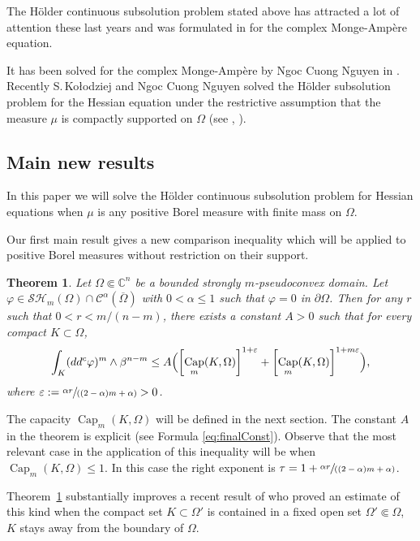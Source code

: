 \documentclass[JEP,XML,SOM,Unicode]{cedram}
\let\epsilon\varepsilon
\newcommand{\spfrac}[2]{\sfrac{#1}{(#2)}}
\newtheorem{theo}{Theorem}
\theoremstyle{definition}
\renewcommand{\C}{\mathbb{C}}
\newcommand{\Cc}{\mathcal{C}}
\DeclareMathOperator{\Capa}{Cap}
\begin{document}
The Hölder continuous subsolution problem stated above has attracted a lot of attention these last years and was formulated in \cite{DGZ16} for the complex Monge-Ampère equation.

\smallskip
It has been solved for the complex Monge-Ampère by Ngoc Cuong Nguyen in \cite{N18a,N18b}.
Recently S.\,Ko{\l}odziej and Ngoc Cuong Nguyen solved the Hölder subsolution problem for the Hessian equation under the restrictive assumption that the measure $\mu$ is compactly supported on $\Omega$ (see \cite{KN18}, \cite{KN19}).

\subsection{Main new results}

In this paper we will solve the Hölder continuous subsolution problem for Hessian equations when $\mu$ is any positive Borel measure with finite mass on $\Omega$.

Our first main result gives a new comparison inequality which will be applied to positive Borel measures without restriction on their support.

\begin{theo}\label{th:A}
Let $\Omega \Subset \C^n$ be a bounded strongly $m$-pseudoconvex domain.
Let $\varphi\in \mathcal{SH}_m(\Omega)\cap \Cc^{\alpha}(\overline\Omega)$ with $0 < \alpha \leq 1$ such that $\varphi = 0$ in $\partial \Omega$. Then for any $r$ such that $0 < r < m \slash (n-m)$, there exists a constant $A>0$ such that for every compact $K\subset\Omega$,
\[
\int_ K (dd^c\varphi)^m\wedge\beta^{n-m} \leq A\Bigl(\left[\Capa_m (K,\Omega)\right]^{1 + \epsilon} + \left[\Capa_m (K,\Omega)\right]^{1 + m\epsilon}\Bigr),
\]
where $\epsilon:= \spfrac{\alpha r}{(2-\alpha) m + \alpha} > 0$.
\end{theo}

The capacity $\Capa_m (K,\Omega)$ will be defined in the next section. The constant $A$ in the theorem is explicit (see Formula \eqref{eq:finalConst}). Observe that the most relevant case in the application of this inequality will be when $\Capa_m (K,\Omega) \leq 1$. In this case the right exponent is $\tau = 1 + \spfrac{\alpha r}{(2-\alpha) m + \alpha}$.

Theorem~\ref{th:A} substantially improves a recent result of \cite{KN19} who proved an estimate of this kind when the compact set $K \subset \Omega'$ is contained in a fixed open set $\Omega' \Subset \Omega$, \ie $K$ stays away from the boundary of $\Omega$.
\end{document}
